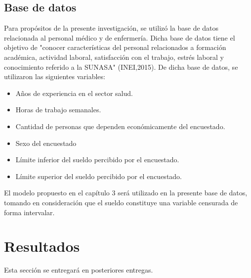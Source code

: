 \subsection{Base de datos}
Para propósitos de la presente investigación, se utilizó la base de datos relacionada al personal médico y de enfermería. Dicha base de datos tiene el objetivo de "conocer características del personal relacionados a formación académica, actividad laboral, satisfacción con el trabajo, estrés laboral y conocimiento referido a la SUNASA" (INEI,2015). De dicha base de datos, se utilizaron las siguientes variables:
\begin{itemize}
	\item Años de experiencia en el sector salud.
	\item Horas de trabajo semanales.
	\item Cantidad de personas que dependen económicamente del encuestado.
	\item Sexo del encuestado
	\item Límite inferior del sueldo percibido por el encuestado.
	\item Límite superior del sueldo percibido por el encuestado.
\end{itemize}

El modelo propuesto en el capítulo 3 será utilizado en la presente base de datos, tomando en consideración que el sueldo constituye una variable censurada de forma intervalar. 

\section{Resultados}

Esta sección se entregará en posteriores entregas.
